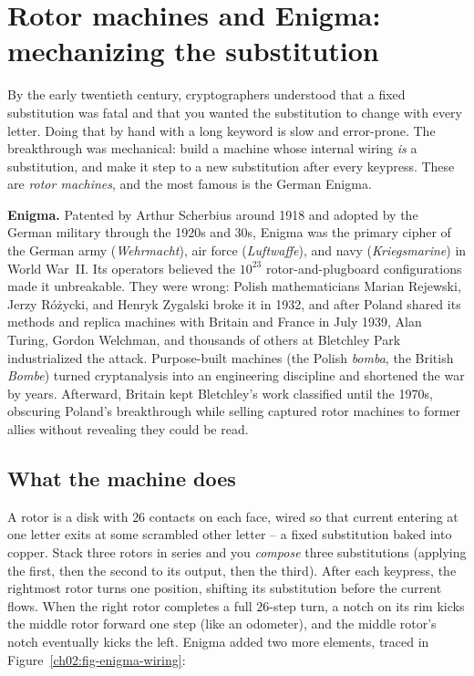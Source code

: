\section{Rotor machines and Enigma: mechanizing the substitution}
\label{ch02:enigma}

By the early twentieth century, cryptographers understood that a fixed substitution was fatal
and that you wanted the substitution to change with every letter. Doing that by hand with a
long keyword is slow and error-prone. The breakthrough was mechanical: build a machine whose
internal wiring \emph{is} a substitution, and make it step to a new substitution after every
keypress. These are \emph{rotor machines}, and the most famous is the German Enigma.

\begin{historybox}
\textbf{Enigma.} Patented by Arthur Scherbius around 1918 and adopted by the German military through the 1920s and 30s, Enigma was the primary cipher of the German army (\emph{Wehrmacht}), air force (\emph{Luftwaffe}), and navy (\emph{Kriegsmarine}) in World War~II. Its operators believed the $10^{23}$ rotor-and-plugboard configurations made it unbreakable. They were wrong: Polish mathematicians Marian Rejewski, Jerzy R\'o\.zycki, and Henryk Zygalski broke it in 1932, and after Poland shared its methods and replica machines with Britain and France in July 1939, Alan Turing, Gordon Welchman, and thousands of others at Bletchley Park industrialized the attack. Purpose-built machines (the Polish \emph{bomba}, the British \emph{Bombe}) turned cryptanalysis into an engineering discipline and shortened the war by years. Afterward, Britain kept Bletchley's work classified until the 1970s, obscuring Poland's breakthrough while selling captured rotor machines to former allies without revealing they could be read.
\end{historybox}

\subsection{What the machine does}

A rotor is a disk with $26$ contacts on each face, wired so that current entering at one
letter exits at some scrambled other letter -- a fixed substitution baked into copper. Stack
three rotors in series and you \emph{compose} three substitutions (applying the first, then the
second to its output, then the third). After each keypress, the rightmost rotor turns one
position, shifting its substitution before the current flows. When the right rotor completes a
full $26$-step turn, a notch on its rim kicks the middle rotor forward one step (like an
odometer), and the middle rotor's notch eventually kicks the left. Enigma added two more
elements, traced in Figure~\ref{ch02:fig-enigma-wiring}:

